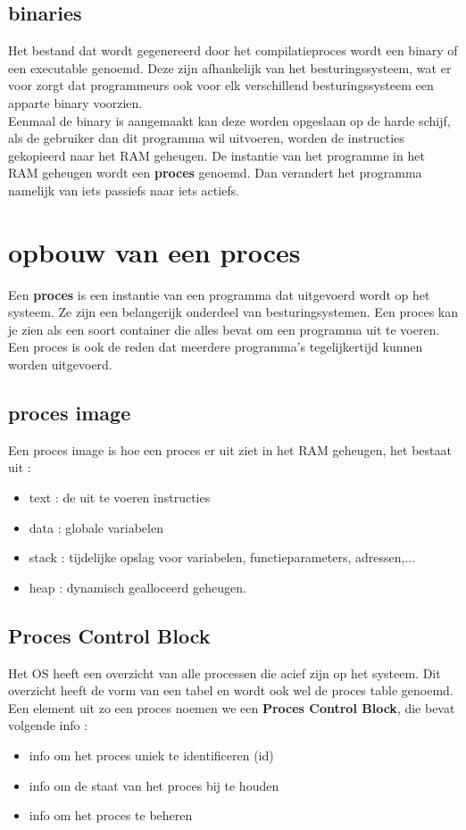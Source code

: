 \documentclass{report}
\begin{document}
   			\subsection{binaries}
   				Het bestand dat wordt gegenereerd door het compilatieproces wordt een binary of een executable genoemd. Deze zijn afhankelijk van het besturingssysteem, wat er voor zorgt dat programmeurs ook voor elk verschillend besturingssysteem een apparte binary voorzien. 
   				\\
   				Eenmaal de binary is aangemaakt kan deze worden opgeslaan op de harde schijf, als de gebruiker dan dit programma wil uitvoeren, worden de instructies gekopieerd naar het RAM geheugen. De instantie van het programme in het RAM geheugen wordt een \textbf{proces} genoemd. Dan verandert het programma namelijk van iets passiefs naar iets actiefs. 
   		\section{opbouw van een proces}
   			Een \textbf{proces} is een instantie van een programma dat uitgevoerd wordt op het systeem. Ze zijn een belangerijk onderdeel van besturingsystemen. Een proces kan je zien als een soort container die alles bevat om een programma uit te voeren. Een proces is ook de reden dat meerdere programma's tegelijkertijd kunnen worden uitgevoerd. 
   			\subsection{proces image}
   				Een proces image is hoe een proces er uit ziet in het RAM geheugen, het bestaat uit : 
   				\begin{itemize}
   					\item text : de uit te voeren instructies 
   					\item data : globale variabelen 
   					\item stack : tijdelijke opslag voor variabelen, functieparameters, adressen,...
   					\item heap : dynamisch gealloceerd geheugen. 
   				\end{itemize}
   			\subsection{Proces Control Block}
   				Het OS heeft een overzicht van alle processen die acief zijn op het systeem. Dit overzicht heeft de vorm van een tabel en wordt ook wel de proces table genoemd. Een element uit zo een proces noemen we een \textbf{Proces Control Block}, die bevat volgende info : 
   				\begin{itemize}
   					\item info om het proces uniek te identificeren (id)
   					\item info om de staat van het proces bij te houden
   					\item info om het proces te beheren
				\end{itemize}   
\end{document}
